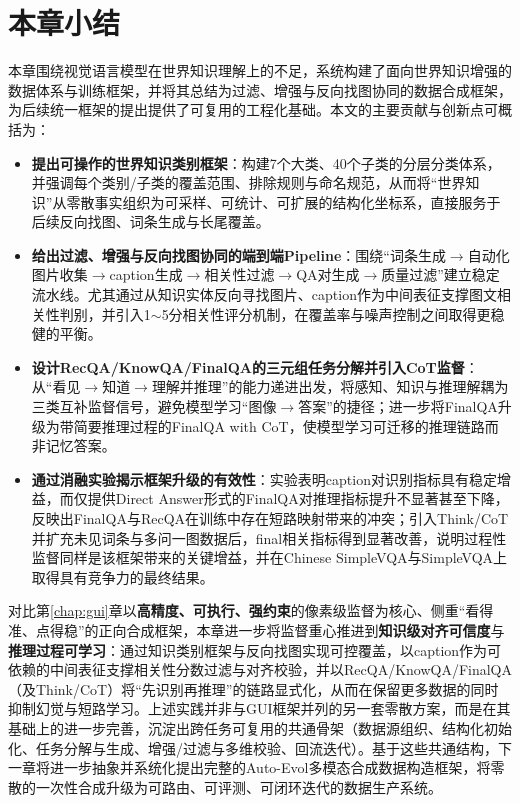 \section{本章小结}
本章围绕视觉语言模型在世界知识理解上的不足，系统构建了面向世界知识增强的数据体系与训练框架，并将其总结为过滤、增强与反向找图协同的数据合成框架，为后续统一框架的提出提供了可复用的工程化基础。本文的主要贡献与创新点可概括为：
\begin{itemize}
  \item \textbf{提出可操作的世界知识类别框架}：构建7个大类、40个子类的分层分类体系，并强调每个类别/子类的覆盖范围、排除规则与命名规范，从而将“世界知识”从零散事实组织为可采样、可统计、可扩展的结构化坐标系，直接服务于后续反向找图、词条生成与长尾覆盖。
  \item \textbf{给出过滤、增强与反向找图协同的端到端Pipeline}：围绕“词条生成$\rightarrow$自动化图片收集$\rightarrow$caption生成$\rightarrow$相关性过滤$\rightarrow$QA对生成$\rightarrow$质量过滤”建立稳定流水线。尤其通过从知识实体反向寻找图片、caption作为中间表征支撑图文相关性判别，并引入1$\sim$5分相关性评分机制，在覆盖率与噪声控制之间取得更稳健的平衡。
  \item \textbf{设计RecQA/KnowQA/FinalQA的三元组任务分解并引入CoT监督}：从“看见$\rightarrow$知道$\rightarrow$理解并推理”的能力递进出发，将感知、知识与推理解耦为三类互补监督信号，避免模型学习“图像$\rightarrow$答案”的捷径；进一步将FinalQA升级为带简要推理过程的FinalQA with CoT，使模型学习可迁移的推理链路而非记忆答案。
  \item \textbf{通过消融实验揭示框架升级的有效性}：实验表明caption对识别指标具有稳定增益，而仅提供Direct Answer形式的FinalQA对推理指标提升不显著甚至下降，反映出FinalQA与RecQA在训练中存在短路映射带来的冲突；引入Think/CoT并扩充未见词条与多问一图数据后，final相关指标得到显著改善，说明过程性监督同样是该框架带来的关键增益，并在Chinese SimpleVQA与SimpleVQA上取得具有竞争力的最终结果。
\end{itemize}

对比第\ref{chap:gui}章以\textbf{高精度、可执行、强约束}的像素级监督为核心、侧重“看得准、点得稳”的正向合成框架，本章进一步将监督重心推进到\textbf{知识级对齐可信度}与\textbf{推理过程可学习}：通过知识类别框架与反向找图实现可控覆盖，以caption作为可依赖的中间表征支撑相关性分数过滤与对齐校验，并以RecQA/KnowQA/FinalQA（及Think/CoT）将“先识别再推理”的链路显式化，从而在保留更多数据的同时抑制幻觉与短路学习。上述实践并非与GUI框架并列的另一套零散方案，而是在其基础上的进一步完善，沉淀出跨任务可复用的共通骨架（数据源组织、结构化初始化、任务分解与生成、增强/过滤与多维校验、回流迭代）。基于这些共通结构，下一章将进一步抽象并系统化提出完整的Auto-Evol多模态合成数据构造框架，将零散的一次性合成升级为可路由、可评测、可闭环迭代的数据生产系统。
